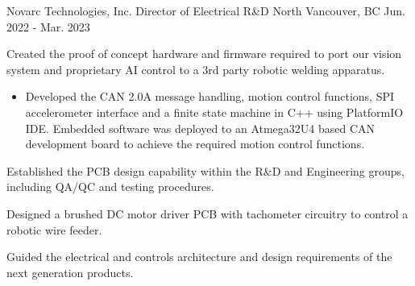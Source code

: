 


\begin{cventries}

    \cventry
    {Novarc Technologies, Inc.} %
    {Director of Electrical R\&D} %
    {North Vancouver, BC} %
    {Jun. 2022 - Mar. 2023} %
    { %
        \begin{cvitems}
            \item {Created the proof of concept hardware and firmware required to port our vision system and proprietary AI control to a 3rd party robotic
                        welding apparatus.}
            \begin{itemize}
                \item {Developed the CAN 2.0A message handling, motion control functions, SPI accelerometer interface and a finite state machine in C++ using PlatformIO IDE. Embedded software was deployed to an Atmega32U4 based CAN development board to achieve the required motion control functions.}
            \end{itemize}
            \item {Established the PCB design capability within the R\&D and Engineering groups, including QA/QC and testing procedures.}
            \item {Designed a brushed DC motor driver PCB with tachometer circuitry to control a robotic wire feeder.}
            \item {Guided the electrical and controls architecture and design requirements of the next generation products.}
        \end{cvitems}
    }



\end{cventries}
